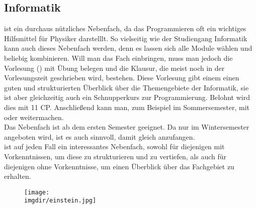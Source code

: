 \subsection{Informatik}
\label{subsec:informatik}
 ist ein durchaus nützliches Nebenfach, da das Programmieren oft ein wichtiges Hilfsmittel für Physiker darstelllt. So vielseitig wie der Studiengang Informatik kann auch dieses Nebenfach werden, denn es lassen sich alle Module wählen und beliebig kombinieren. Will man das Fach einbringen, muss man jedoch die Vorlesung  () mit Übung belegen und die Klausur, die meist noch in der Vorlesungszeit geschrieben wird, bestehen. Diese Vorlesung gibt einem einen guten und strukturierten Überblick über die Themengebiete der Informatik, sie ist aber gleichzeitig auch ein Schnupperkurs zur Programmierung. Belohnt wird dies mit 11 CP. Anschlie\ss end kann man, zum Beispiel im Sommersemester, mit  oder  weitermachen.\\
Das Nebenfach ist ab dem ersten Semester geeignet. Da  nur im Wintersemester angeboten wird, ist es auch sinnvoll, damit gleich anzufangen.\\
 ist auf jeden Fall ein interessantes Nebenfach, sowohl für diejenigen mit Vorkenntnissen, um diese zu strukturieren und zu vertiefen, als auch für diejenigen ohne Vorkenntnisse, um einen Überblick über das Fachgebiet zu erhalten.
\begin{figure}
	\centering
  	\texttt{[image: \\imgdir/einstein.jpg]}
\end{figure}